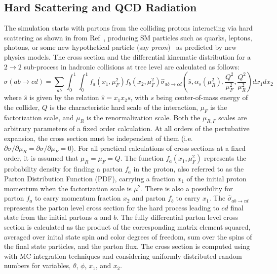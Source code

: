 \subsection{Hard Scattering and QCD Radiation}
The simulation starts with partons from the colliding protons interacting via hard scattering as shown in \fig{\ref{fig:EventGeneration}} from 
Ref~\cite{Dobbs:2004qw}, producing SM particles such as quarks, leptons, photons, or some new hypothetical particle (say \emph{preon})~\cite{Pati:1975md,Eichten:1983hw,Baur:1987ga} as predicted by new physics models. The cross section and the differential kinematic distribution 
for a $2\to2$ sub-process in hadronic collisions at tree level are calculated as follows:
\begin{equation}
\sigma(ab\rightarrow{cd})=\sum_{ab}\int_{0}^{1}\int_{0}^{1} f_{a}(x_{1},\mu_{F}^{2})f_{b}(x_{2},\mu_{F}^{2})\hat{\sigma}_{ab\rightarrow{cd}}
                           \left(\hat{s},\alpha_{s}(\mu_{R}^{2}),\frac{Q^{2}}{\mu_{F}^{2}},\frac{Q^{2}}{\mu_{R}^{2}}\right)dx_{1}dx_{2} 
\label{eq:gamJetXS}
\end{equation}
where $\hat{s}$ is given by the relation $\hat{s}=x_{1}x_{2}s$, with $s$ being center-of-mass energy of the collider, $Q$ is the characteristic hard 
scale of the interaction, $\mu_{F}$ is the factorization scale, and $\mu_{R}$ is the renormalization scale. Both the $\mu_{R,F}$ scales are arbitrary 
parameters of a fixed order calculation. At all orders of the pertubative expansion, the cross section must be independent of them (i.e. $\partial
\sigma/\partial\mu_{R} = \partial\sigma/\partial\mu_{F} = 0$). For all practical calculations of cross sections at a fixed order, it is assumed that 
$\mu_{R}=\mu_{F}=Q$. The function $f_{a}(x_{1},\mu^{2}_{F})$ represents the probability density for finding a parton $f_{a}$ in the proton, also 
referred to as the Parton Distribution Function (PDF), carrying a fraction $x_{1}$ of the initial proton momentum when the factorization scale is 
$\mu^{2}$. There is also a possibility for parton $f_{a}$ to carry momentum fraction $x_{2}$ and parton $f_{b}$ to carry $x_{1}$.
The $\hat{\sigma}_{ab\rightarrow{cd}}$ represents the parton level cross section for the hard 
process leading to $cd$ final state from the initial partons $a$ and $b$. The fully differential parton level cross section is calculated as the 
product of the corresponding matrix element squared, averaged over inital state spin and color degrees of freedom, sum over the spins of the final
state particles, and the parton flux. The cross section is computed using \eqn{\ref{eq:gamJetXS}} with MC integration techniques and considering 
uniformly distributed random numbers for variables, $\theta$, $\phi$, $x_{1}$, and $x_{2}$.

